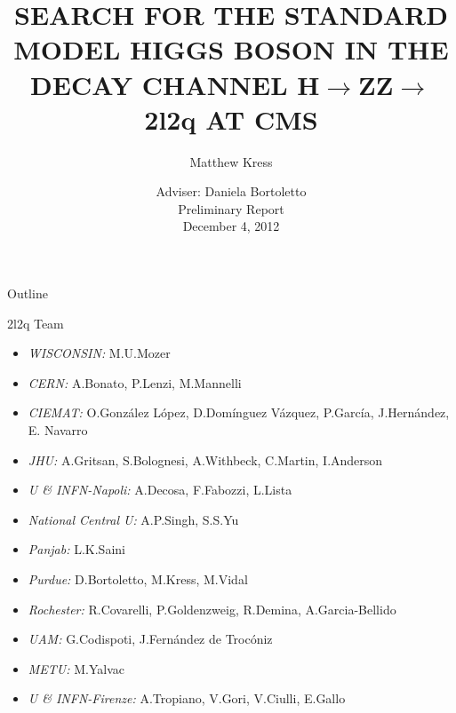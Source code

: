 \documentclass{beamer}
\title[H$\rightarrow$ZZ$\rightarrow$2l2q] %
{SEARCH FOR THE STANDARD MODEL HIGGS BOSON IN THE DECAY CHANNEL H$\rightarrow$ZZ$\rightarrow$2l2q AT CMS}
\author[Matthew Kress] %
{Matthew Kress}
\institute[Purdue University] %
\date[December 4, 2012] %
{Adviser: Daniela Bortoletto
\\

Preliminary Report%
\\
December 4, 2012
}
\begin{document}
\begin{frame}
  \titlepage
\end{frame}

\begin{frame}{Outline}
  \tableofcontents
\end{frame}




\begin{frame}{2l2q Team}
  \begin{itemize}
    \footnotesize
  \item
    \emph{\color{red} WISCONSIN:} M.U.Mozer
  \item
    \emph{\color{red} CERN:} A.Bonato, P.Lenzi, M.Mannelli	
  \item
    \emph{\color{red} CIEMAT:} O.Gonz\'{a}lez L\'{o}pez, D.Dom\'{i}nguez V\'{a}zquez, P.Garc\'{i}a, J.Hern\'{a}ndez, E. Navarro
  \item
    \emph{\color{red} JHU:} A.Gritsan, S.Bolognesi, A.Withbeck, C.Martin, I.Anderson
  \item
    \emph{\color{red} U \& INFN-Napoli:} A.Decosa, F.Fabozzi, L.Lista
  \item
    \emph{\color{red} National Central U:} A.P.Singh, S.S.Yu
  \item
    \emph{\color{red} Panjab:} L.K.Saini
  \item
    \emph{\color{red} Purdue:} D.Bortoletto, M.Kress, M.Vidal
  \item
    \emph{\color{red} Rochester:} R.Covarelli, P.Goldenzweig, R.Demina, A.Garcia-Bellido
  \item
    \emph{\color{red} UAM:} G.Codispoti, J.Fern\'{a}ndez de Troc\'{o}niz
  \item
    \emph{\color{red} METU:} M.Yalvac
  \item
    \emph{\color{red} U \& INFN-Firenze:} A.Tropiano, V.Gori, V.Ciulli, E.Gallo

    
  \end{itemize}
\end{frame}
\end{document}
